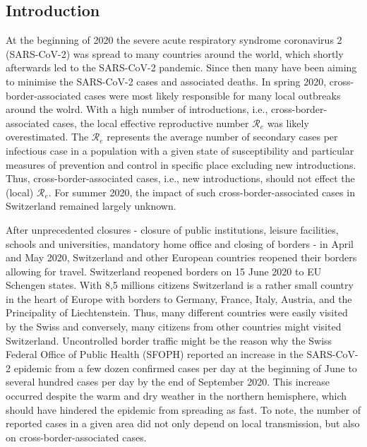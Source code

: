 \documentclass[10pt, a4paper, twoside]{article}
\begin{document}
\begin{multicols}{2}
\section{Introduction}

\lhead{ }
At the beginning of 2020 the severe acute respiratory syndrome coronavirus 2 (SARS-CoV-2) was spread to many countries around the world, which shortly afterwards led to the SARS-CoV-2 pandemic.\cite{worobey_emergence_2020}
Since then many have been aiming to minimise the SARS-CoV-2 cases and associated deaths.
In spring 2020, cross-border-associated cases were most likely responsible for many local outbreaks around the wolrd.\cite{russell_effect_2021}
With a high number of introductions, i.e., cross-border-associated cases, the local effective reproductive number $\mathcal{R}_e$ was likely overestimated.\cite{roberts_early_2011}
The $\mathcal{R}_e$ represents the average number of secondary cases per infectious case in a population with a given state of susceptibility and particular measures of prevention and control in specific place excluding new introductions.
Thus, cross-border-associated cases, i.e., new introductions, should not effect the (local) $\mathcal{R}_e$.
For summer 2020, the impact of such cross-border-associated cases in Switzerland remained largely unknown.

After unprecedented closures - closure of public institutions, leisure facilities, schools and universities, mandatory home office and closing of borders -  in April and May 2020, Switzerland and other European countries reopened their borders allowing for travel.
Switzerland reopened borders on 15 June 2020 to EU Schengen states.\cite{federal_council_coronavirus_2020}
With 8,5 millions citizens Switzerland is a rather small country in the heart of Europe with borders to Germany, France, Italy, Austria, and the Principality of Liechtenstein.
Thus, many different countries were easily visited by the Swiss and conversely, many citizens from other countries might visited Switzerland.
Uncontrolled border traffic might be the reason why the Swiss Federal Office of Public Health (SFOPH) reported an increase in the SARS-CoV-2 epidemic from a few dozen confirmed cases per day at the beginning of June to several hundred cases per day by the end of September 2020.
This increase occurred despite the warm and dry weather in the northern hemisphere, which should have hindered the epidemic from spreading as fast.\cite{neher_potential_2020} 
To note, the number of reported cases in a given area did not only depend on local transmission, but also on cross-border-associated cases.


\end{multicols}
\end{document}
